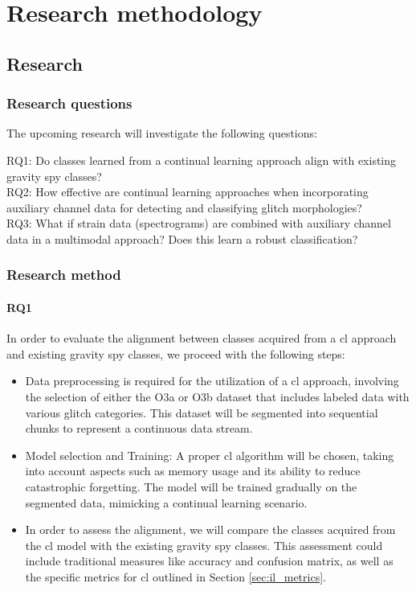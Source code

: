 \chapter{Research methodology}
\section{Research}
\label{sec-Research}
\subsection{Research questions}
The upcoming research will investigate the following questions:  

\begin{mdframed}[backgroundcolor=lightgray!20]
\par RQ1: Do classes learned from a continual learning approach align with existing gravity spy classes?\\
RQ2: How effective are continual learning approaches when incorporating auxiliary channel data for detecting and classifying glitch morphologies?\\
RQ3: What if strain data (spectrograms) are combined with auxiliary channel data in a multimodal approach? Does this learn a robust classification?
\end{mdframed}

\subsection{Research method}
\label{subsec-researchmethod}
\subsubsection{RQ1}
In order to evaluate the alignment between classes acquired from a \acrlong{cl} approach and existing gravity spy classes, we proceed with the following steps:
\begin{itemize}
    \item Data preprocessing is required for the utilization of a \acrshort{cl} approach, involving the selection of either the O3a or O3b dataset that includes labeled data with various glitch categories. This dataset will be segmented into sequential chunks to represent a continuous data stream.
    \item Model selection and Training: A proper \acrshort{cl} algorithm will be chosen, taking into account aspects such as memory usage and its ability to reduce catastrophic forgetting. The model will be trained gradually on the segmented data, mimicking a continual learning scenario.
    \item In order to assess the alignment, we will compare the classes acquired from the \acrshort{cl} model with the existing gravity spy classes. This assessment could include traditional measures like accuracy and confusion matrix, as well as the specific metrics for \acrshort{cl} outlined in Section \ref{sec:il_metrics}. 
\end{itemize}
